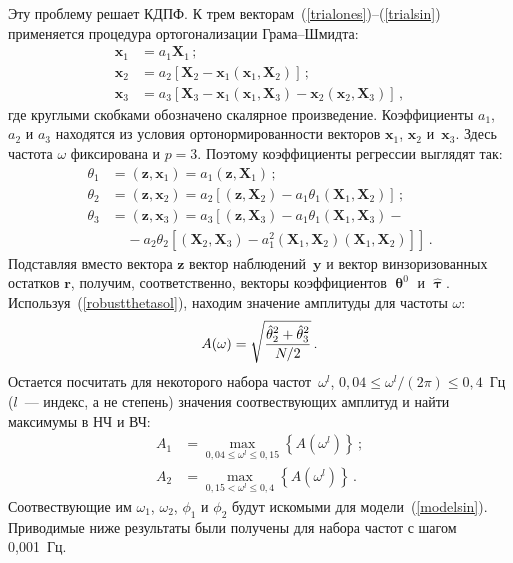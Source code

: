 \begin{multicols}{2}
Эту проблему решает КДПФ. К трем векторам~(\ref{trialones})--(\ref{trialsin})
применяется процедура ортогонализации Грама--Шмидта:
\begin{align*}
\mathbf{x}_1 &= a_1 \mathbf{X}_1\,; \\
\mathbf{x}_2 &= a_2 \left[ \mathbf{X}_2 - \mathbf{x}_1(\mathbf{x}_1,\mathbf{X}_2) \right]\,; \\
\mathbf{x}_3 &= a_3 \left[ \mathbf{X}_3 -
\mathbf{x}_1(\mathbf{x}_1,\mathbf{X}_3) -
\mathbf{x}_2(\mathbf{x}_2,\mathbf{X}_3) \right]\,,
\end{align*}
где
круглыми скобками обозначено скалярное произведение. Коэффициенты
$a_1$, $a_2$ и $a_3$ находятся из условия ортонормированности
векторов $\mathbf{x}_1$, $\mathbf{x}_2$ и~$\mathbf{x}_3$. Здесь
частота $\omega$ фиксирована и $p=3$. Поэтому коэффициенты
регрессии выглядят так:
\begin{align*}
\theta_1 & = (\mathbf{z},\mathbf{x}_1) = a_1 (\mathbf{z},\mathbf{X}_1)\,; \\
\theta_2 &= (\mathbf{z},\mathbf{x}_2) = a_2 \left[ (\mathbf{z},\mathbf{X}_2)-a_1\theta_1(\mathbf{X}_1,\mathbf{X}_2) \right]\,; \\
\theta_3 &= (\mathbf{z},\mathbf{x}_3) = a_3 \left[ (\mathbf{z},\mathbf{X}_3)-a_1\theta_1(\mathbf{X}_1,\mathbf{X}_3)-{} \right.  \\
 &\ \ \ \ \ {}- \left.a_2\theta_2[(\mathbf{X}_2,\mathbf{X}_3)-a_1^2(\mathbf{X}_1,\mathbf{X}_2)(\mathbf{X}_1,\mathbf{X}_2)] \right]\,.
\end{align*}
Подставляя вместо вектора $\mathbf{z}$ вектор
наблюдений~$\mathbf{y}$ и вектор винзоризованных остатков
$\mathbf{r}$, получим, соответственно, векторы коэффициентов
$\bm{\uptheta}^0$ и $\hat{\bm{\uptau}}$. Используя~(\ref{robustthetasol}),
находим значение амплитуды для частоты
$\omega$:
\begin{equation*}
A(\omega) =
\sqrt{\displaystyle\frac{\displaystyle \hat{\theta}_2^2+\hat{\theta}_3^2\mathstrut}{\displaystyle N/2\mathstrut}}\,.
\end{equation*}
Остается посчитать для некоторого набора час\-тот~$\omega^l$, 
$0{,}04 \leq \omega^l/(2\pi) \leq 0{,}4$~Гц 
($l$~--- индекс, а не степень) значения соотвествующих
амплитуд и найти максимумы в НЧ и ВЧ:
\begin{align*}
A_1 &=
\max_{0{,}04\leq\omega^l\leq 0{,}15}\left\{A(\omega^l) \right\}\,;\\
A_2 &= \max_{0{,}15<\omega^l\leq 0{,}4}\left\{A(\omega^l)
\right\}\,.
\end{align*}
Соотвествующие им $\omega_1$, $\omega_2$,
$\phi_1$ и $\phi_2$ будут искомыми для модели~(\ref{modelsin}).
Приводимые ниже результаты были получены для набора частот с шагом
0,001~Гц.


\end{multicols}
